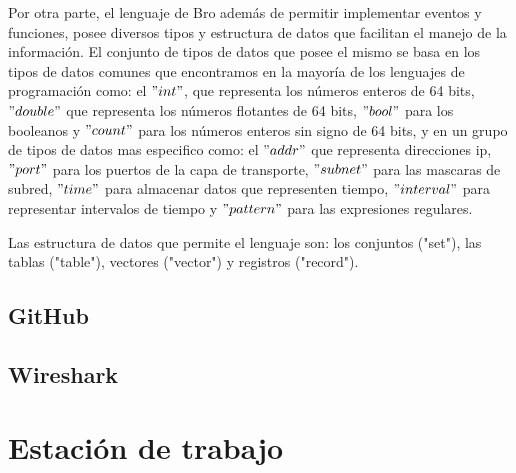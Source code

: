 Por otra parte, el lenguaje de Bro además de permitir implementar eventos y funciones, posee diversos tipos y estructura de datos que facilitan el manejo de la información. 
El conjunto de tipos de datos que posee el mismo se basa en los tipos de datos comunes que encontramos en la mayoría de los lenguajes de programación como: el $"int"$, que representa los números enteros de 64 bits, $"double"$ que representa los números flotantes de 64 bits, $"bool"$ para los booleanos y $"count"$  para los números enteros sin signo de 64 bits, y en un grupo de tipos de datos  mas especifico como: el $"addr"$ que representa direcciones ip, $"port"$ para los puertos de la capa de transporte, $"subnet"$ para las mascaras de subred, $"time"$ para almacenar datos que representen tiempo, $"interval"$ para representar intervalos de tiempo y $"pattern"$ para las expresiones regulares.

Las estructura de datos que permite el lenguaje son: los conjuntos ("set"), las tablas ("table"), vectores ("vector") y registros ("record").

\subsection{GitHub}

\subsection{Wireshark}

\section{Estación de trabajo}